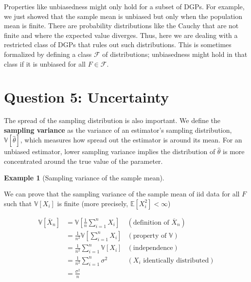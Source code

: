 \documentclass[
  13pt,
  letterpaper,
  DIV=11,
  numbers=noendperiod]{scrreprt}
\newcommand{\E}{\mathbb{E}}
\newcommand{\V}{\mathbb{V}}
\newcommand{\Xbar}{\overline{X}}
\theoremstyle{plain}
\theoremstyle{definition}
\newtheorem{example}{Example}[chapter]
\theoremstyle{definition}
\theoremstyle{remark}
\begin{document}
\begin{tcolorbox}[enhanced jigsaw, title=\textcolor{quarto-callout-warning-color}{\faExclamationTriangle}\hspace{0.5em}{Warning}, breakable, colbacktitle=quarto-callout-warning-color!10!white, toptitle=1mm, colback=white, arc=.35mm, left=2mm, opacityback=0, titlerule=0mm, colframe=quarto-callout-warning-color-frame, leftrule=.75mm, coltitle=black, opacitybacktitle=0.6, bottomtitle=1mm, rightrule=.15mm, bottomrule=.15mm, toprule=.15mm]

Properties like unbiasedness might only hold for a subset of DGPs. For
example, we just showed that the sample mean is unbiased but only when
the population mean is finite. There are probability distributions like
the Cauchy that are not finite and where the expected value diverges.
Thus, here we are dealing with a restricted class of DGPs that rules out
such distributions. This is sometimes formalized by defining a class
\(\mathcal{F}\) of distributions; unbiasedness might hold in that class
if it is unbiased for all \(F \in \mathcal{F}\).

\end{tcolorbox}

\section{Question 5: Uncertainty}\label{question-5-uncertainty-1}

The spread of the sampling distribution is also important. We define the
\textbf{sampling variance} as the variance of an estimator's sampling
distribution, \(\V[\widehat{\theta}]\), which measures how spread out
the estimator is around its mean. For an unbiased estimator, lower
sampling variance implies the distribution of \(\widehat{\theta}\) is
more concentrated around the true value of the parameter.

\begin{example}[Sampling variance of the sample
mean]\protect\hypertarget{exm-mean-var}{}\label{exm-mean-var}

We can prove that the sampling variance of the sample mean of iid data
for all \(F\) such that \(\V[X_i]\) is finite (more precisely,
\(\E[X_i^2] < \infty\))

\[\begin{aligned}
  \V\left[ \Xbar_n \right] &= \V\left[ \frac{1}{n} \sum_{i=1}^n X_i \right] & (\text{definition of } \Xbar_n) \\
                           &= \frac{1}{n^2} \V\left[ \sum_{i=1}^n X_i \right] & (\text{property of } \V) \\
                           &= \frac{1}{n^2} \sum_{i=1}^n \V[X_i] & (\text{independence}) \\
                           &= \frac{1}{n^2} \sum_{i=1}^n \sigma^2 & (X_i \text{ identically distributed}) \\
                           &= \frac{\sigma^2}{n}
\end{aligned}\]

\end{example}
\end{document}
